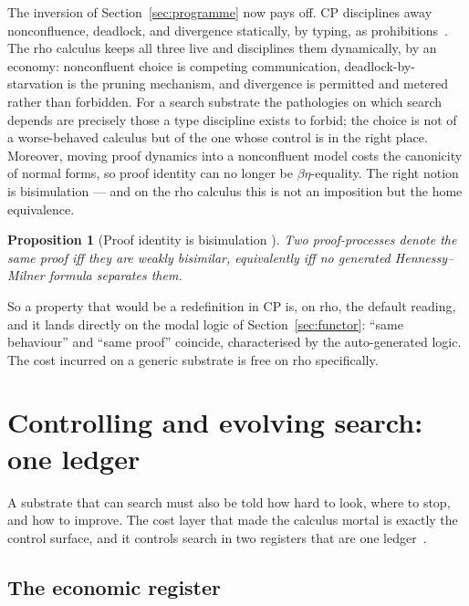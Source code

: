 \documentclass[11pt]{article}
\theoremstyle{definition}
\theoremstyle{plain}
\newtheorem{proposition}[definition]{Proposition}
\begin{document}
The inversion of Section~\ref{sec:programme} now pays off. CP disciplines away
nonconfluence, deadlock, and divergence statically, by typing, as
prohibitions~\cite{Wadler14}. The rho calculus keeps all three live and
disciplines them dynamically, by an economy: nonconfluent choice is competing
communication, deadlock-by-starvation is the pruning mechanism, and divergence
is permitted and metered rather than forbidden. For a search substrate the
pathologies on which search depends are precisely those a type discipline exists
to forbid; the choice is not of a worse-behaved calculus but of the one whose
control is in the right place. Moreover, moving proof dynamics into a
nonconfluent model costs the canonicity of normal forms, so proof identity can
no longer be $\beta\eta$-equality. The right notion is bisimulation --- and on
the rho calculus this is not an imposition but the home equivalence.

\begin{proposition}[Proof identity is bisimulation {\cite{NoteIV}}]
Two proof-processes denote the same proof iff they are weakly bisimilar,
equivalently iff no generated Hennessy--Milner formula separates them.
\end{proposition}

So a property that would be a redefinition in CP is, on rho, the default
reading, and it lands directly on the modal logic of Section~\ref{sec:functor}:
``same behaviour'' and ``same proof'' coincide, characterised by the
auto-generated logic. The cost incurred on a generic substrate is free on rho
specifically.

\section{Controlling and evolving search: one ledger}\label{sec:control}

A substrate that can search must also be told how hard to look, where to stop,
and how to improve. The cost layer that made the calculus mortal is exactly the
control surface, and it controls search in two registers that are one
ledger~\cite{NoteIII,NoteIV}.

\subsection{The economic register}
\end{document}
